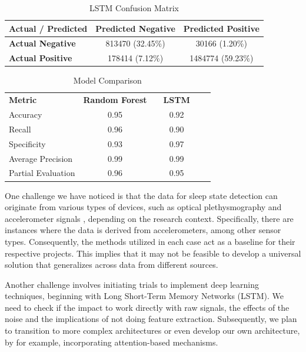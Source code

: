 \documentclass{article}
\begin{document}
\begin{table}[h]
    \centering
    \caption{LSTM Confusion Matrix}
    \label{tab:lstm_confusion_matrix}
    \begin{tabular}{lcc}
        \hline
        \textbf{Actual / Predicted} & \textbf{Predicted Negative} & \textbf{Predicted Positive} \\
        \hline
        \textbf{Actual Negative} & 813470 (32.45\%) & 30166 (1.20\%) \\
        \textbf{Actual Positive} & 178414 (7.12\%) & 1484774 (59.23\%) \\
        \hline
    \end{tabular}
\end{table}

\begin{table}[h]
    \centering
    \caption{Model Comparison}
    \label{tab:model_comparison}
    \begin{tabular}{lccccc}
        \hline
        \textbf{Metric} & \textbf{Random Forest} & & \textbf{LSTM} & \\
        \cline{2-5}
        Accuracy & 0.95 & & 0.92 & \\
        Recall & 0.96 & & 0.90 & \\
        Specificity & 0.93 & & 0.97 & \\
        Average Precision & 0.99 & & 0.99 & \\
        Partial Evaluation & 0.96 & & 0.95 & \\
        \hline
    \end{tabular}
\end{table}


One challenge we have noticed is that the data for sleep state detection can originate from various types of devices, such as optical plethysmography and accelerometer signals \cite{Beattie_2017}\cite{Fedorin2019}, depending on the research context. Specifically, there are instances where the data is derived from accelerometers, among other sensor types. Consequently, the methods utilized in each case act as a baseline for their respective projects. This implies that it may not be feasible to develop a universal solution that generalizes across data from different sources.

Another challenge involves initiating trials to implement deep learning techniques, beginning with Long Short-Term Memory Networks (LSTM). We need to check if the impact to work directly with raw signals, the effects of the noise and the implications of not doing feature extraction. Subsequently, we plan to transition to more complex architectures or even develop our own architecture, by for example, incorporating attention-based mechanisms.
\end{document}
